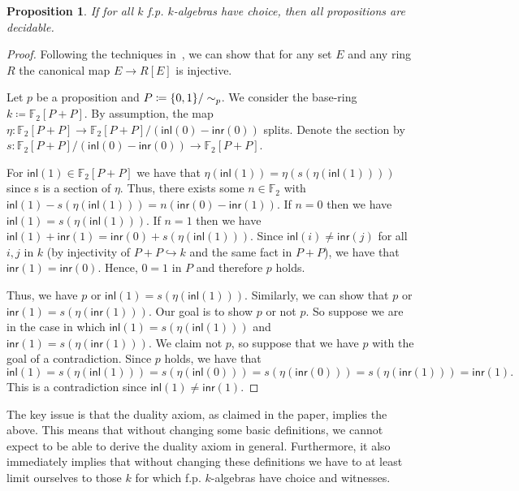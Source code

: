 \documentclass[10pt,a4paper]{article}
\newtheorem{proposition}{Proposition}[section]
\newcommand\inl{\mathsf{inl}}
\newcommand\inr{\mathsf{inr}}
\DeclarePairedDelimiter\set{\{}{\}}
\begin{document}
\begin{proposition}
  If for all \(k\) f.p. \(k\)-algebras have choice, then all propositions are decidable.
\end{proposition}
\begin{proof}
  Following the techniques in~\cite{mines}, we can show that for any set $E$ and any ring $R$ the canonical map $E \to R[E]$ is injective.

  Let $p$ be a proposition and $P \coloneqq \set{0,1} / \sim_p$.
  We consider the base-ring $k \coloneqq \mathbb{F}_2[P + P]$.
  By assumption, the map $\eta \colon \mathbb{F}_2[P + P] \to \mathbb{F}_2[P + P] / (\inl(0) - \inr(0))$ splits.
  Denote the section by $s : \mathbb{F}_2[P + P] / (\inl(0) - \inr(0)) \to \mathbb{F}_2[P + P]$.

  For $\inl(1) \in \mathbb{F}_2[P + P]$ we have that $\eta(\inl(1)) = \eta(s(\eta(\inl(1))))$ since s is a section of $\eta$.
  Thus, there exists some $n \in \mathbb{F}_2$ with $\inl(1) - s(\eta(\inl(1))) = n(\inr(0) - \inr(1))$.
  If $n = 0$ then we have $\inl(1) = s(\eta(\inl(1)))$.
  If $n = 1$ then we have $\inl(1) + \inr(1) = \inr(0) + s(\eta(\inl(1)))$.
  Since $\inl(i) \ne \inr(j)$ for all $i, j$ in $k$ (by injectivity of $P + P \hookrightarrow k$ and the same fact in $P + P$), we have that $\inr(1) = \inr(0)$.
  Hence, $0 = 1$ in $P$ and therefore $p$ holds.

  Thus, we have $p$ or $\inl(1) = s(\eta(\inl(1)))$.
  Similarly, we can show that $p$ or $\inr(1) = s(\eta(\inr(1)))$.
  Our goal is to show $p$ or not $p$.
  So suppose we are in the case in which $\inl(1) = s(\eta(\inl(1)))$ and $\inr(1) = s(\eta(\inr(1)))$.
  We claim not $p$, so suppose that we have $p$ with the goal of a contradiction.
  Since $p$ holds, we have that
  \[
    \inl(1) = s(\eta(\inl(1))) = s(\eta(\inl(0))) = s(\eta(\inr(0))) = s(\eta(\inr(1))) = \inr(1).
  \]
  This is a contradiction since $\inl(1) \ne \inr(1)$.
\end{proof}

The key issue is that the duality axiom, as claimed in the paper, implies the above.
This means that without changing some basic definitions, we cannot expect to be able to derive the duality axiom in general.
Furthermore, it also immediately implies that without changing these definitions we have to at least limit ourselves to those \(k\) for which f.p. \(k\)-algebras have choice and witnesses.
\end{document}
